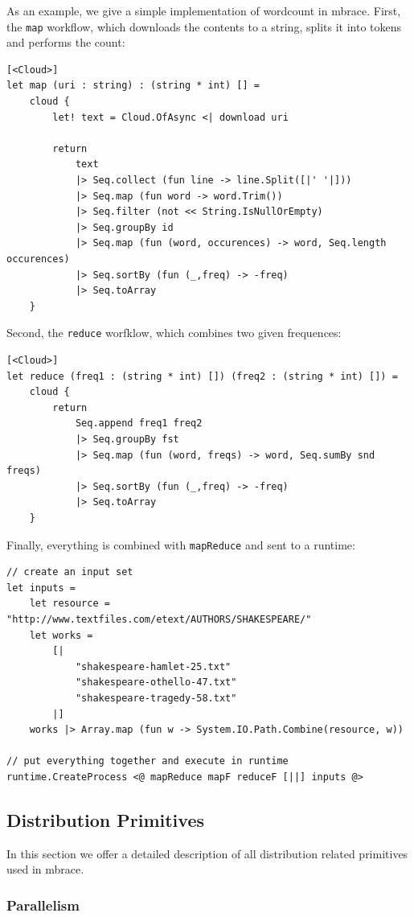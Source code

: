 \documentclass[9pt,a4paper]{article}
\newcommand{\mbrace}{mbrace}
\begin{document}
As an example, we give a simple implementation of wordcount in \mbrace{}.
First, the \texttt{map} workflow, which downloads the contents to a string,
splits it into tokens and performs the count:
\begin{lstlisting}
[<Cloud>]
let map (uri : string) : (string * int) [] =
    cloud {
        let! text = Cloud.OfAsync <| download uri

        return
            text
            |> Seq.collect (fun line -> line.Split([|' '|]))
            |> Seq.map (fun word -> word.Trim())
            |> Seq.filter (not << String.IsNullOrEmpty)
            |> Seq.groupBy id
            |> Seq.map (fun (word, occurences) -> word, Seq.length occurences)
            |> Seq.sortBy (fun (_,freq) -> -freq)
            |> Seq.toArray
    }
\end{lstlisting}
Second, the \texttt{reduce} worfklow, which combines two given frequences:
\begin{lstlisting}
[<Cloud>]
let reduce (freq1 : (string * int) []) (freq2 : (string * int) []) =
    cloud {
        return
            Seq.append freq1 freq2
            |> Seq.groupBy fst
            |> Seq.map (fun (word, freqs) -> word, Seq.sumBy snd freqs)
            |> Seq.sortBy (fun (_,freq) -> -freq)
            |> Seq.toArray
    }
\end{lstlisting}
Finally, everything is combined with \texttt{mapReduce} and sent to a runtime:
\begin{lstlisting}
// create an input set
let inputs =
    let resource = "http://www.textfiles.com/etext/AUTHORS/SHAKESPEARE/"
    let works =
        [|
            "shakespeare-hamlet-25.txt"
            "shakespeare-othello-47.txt"
            "shakespeare-tragedy-58.txt"
        |]
    works |> Array.map (fun w -> System.IO.Path.Combine(resource, w))
    
// put everything together and execute in runtime
runtime.CreateProcess <@ mapReduce mapF reduceF [||] inputs @>
\end{lstlisting}

\subsection{Distribution Primitives}

In this section we offer a detailed description of all distribution related
primitives used in \mbrace{}.

\subsubsection*{Parallelism}
\end{document}

